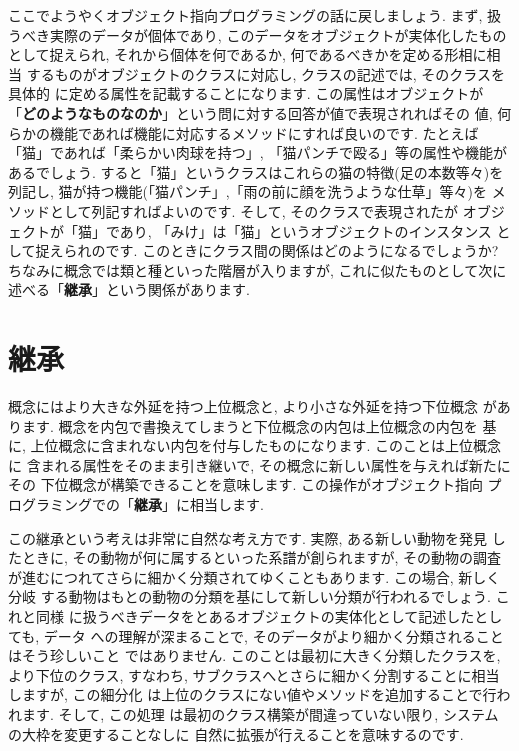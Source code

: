 \documentclass[b5j,8pt,twocolumn]{ltjsarticle}
\begin{document}
ここでようやくオブジェクト指向プログラミングの話に戻しましょう. まず,
 扱うべき実際のデータが個体であり, このデータをオブジェクトが実体化したもの
として捉えられ, それから個体を何であるか, 何であるべきかを定める形相に相当
するものがオブジェクトのクラスに対応し, クラスの記述では, そのクラスを具体的
に定める属性を記載することになります. この属性はオブジェクトが
「\textbf{どのようなものなのか}」という問に対する回答が値で表現されればその
値,  何らかの機能であれば機能に対応するメソッドにすれば良いのです. たとえば
「猫」であれば「柔らかい肉球を持つ」, 「猫パンチで殴る」等の属性や機能が
あるでしょう. すると「猫」というクラスはこれらの猫の特徴(足の本数等々)を
列記し, 猫が持つ機能(「猫パンチ」,「雨の前に顔を洗うような仕草」等々)を
メソッドとして列記すればよいのです. そして, そのクラスで表現されたが
オブジェクトが「猫」であり, 「みけ」は「猫」というオブジェクトのインスタンス
として捉えられのです. このときにクラス間の関係はどのようになるでしょうか?
 ちなみに概念では類と種といった階層が入りますが, これに似たものとして次に
述べる「\textbf{継承}」という関係があります.


\section{継承}


概念にはより大きな外延を持つ上位概念と, より小さな外延を持つ下位概念
があります. 概念を内包で書換えてしまうと下位概念の内包は上位概念の内包を
基に, 上位概念に含まれない内包を付与したものになります. このことは上位概念に
含まれる属性をそのまま引き継いで, その概念に新しい属性を与えれば新たにその
下位概念が構築できることを意味します. この操作がオブジェクト指向
プログラミングでの「\textbf{継承}」に相当します.
\newline


この継承という考えは非常に自然な考え方です. 実際, ある新しい動物を発見
したときに, その動物が何に属するといった系譜が創られますが, その動物の調査
が進むにつれてさらに細かく分類されてゆくこともあります. この場合, 新しく分岐
する動物はもとの動物の分類を基にして新しい分類が行われるでしょう. これと同様
に扱うべきデータをとあるオブジェクトの実体化として記述したとしても, データ
への理解が深まることで, そのデータがより細かく分類されることはそう珍しいこと
ではありません. このことは最初に大きく分類したクラスを, より下位のクラス,
 すなわち, サブクラスへとさらに細かく分割することに相当しますが, この細分化
は上位のクラスにない値やメソッドを追加することで行われます. そして, この処理
は最初のクラス構築が間違っていない限り, システムの大枠を変更することなしに
自然に拡張が行えることを意味するのです.
\newline
\end{document}
